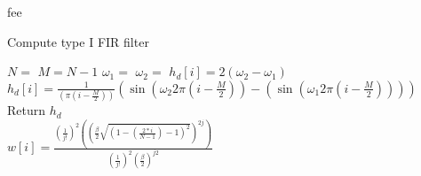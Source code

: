 fee
\begin{algorithm}
\caption{Compute type I FIR filter}
\label{array-sum}
\begin{algorithmic}[1] 
\State $N = $  
\State $M = N-1$ 
\State $\omega_1 = $
\State $\omega_2 = $
        		\State $h_d[i] = 2(\omega_2 - \omega_1)$
        	\Else 
        		\State  $h_d[i] = \frac{1}{ (\pi (i - \frac{M}{2}))}(\sin(\omega_2 2 \pi (i - \frac{M}{2})) - (\sin(\omega_1 2 \pi (i - \frac{M}{2}))))$ 
        	\EndIf 
	\EndFor
	\State Return $h_d$
\EndProcedure
\\
			\State $w[i] =\frac{(\frac{1}{j!})^2 \left( \left( \frac{\beta}{2} \sqrt{\left(1 - \left( \frac{2*i}{N-1}\right) - 1\right)^2}\right)^{2j}\right)}{(\frac{1}{j!})^2 \left( \frac{\beta}{2}\right)^{j2}}$



\EndProcedure 

\end{algorithmic}
\end{algorithm}